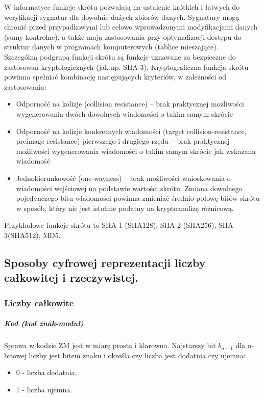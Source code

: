\documentclass[a4paper,12pt,oneside]{book}
\begin{document}
W informatyce funkcje skrótu pozwalają na ustalenie krótkich i łatwych do weryfikacji sygnatur dla dowolnie dużych zbiorów danych. Sygnatury mogą chronić przed przypadkowymi lub celowo wprowadzonymi modyfikacjami danych (sumy kontrolne), a także mają zastosowania przy optymalizacji dostępu do struktur danych w programach komputerowych (tablice mieszające).\\

Szczególną podgrupą funkcji skrótu są funkcje uznawane za bezpieczne do zastosowań kryptologicznych (jak np. SHA-3). Kryptograficzna funkcja skrótu powinna spełniać kombinację następujących kryteriów, w zależności od zastosowania:\\
\begin{itemize}
	\item Odporność na kolizje (collision resistance) – brak praktycznej możliwości wygenerowania dwóch dowolnych wiadomości o takim samym skrócie
	\item Odporność na kolizje konkretnych wiadomości (target collision-resistance, preimage resistance) pierwszego i drugiego rzędu – brak praktycznej możliwości wygenerowania wiadomości o takim samym skrócie jak wskazana wiadomość
	\item Jednokierunkowość (one-wayness) – brak możliwości wnioskowania o wiadomości wejściowej na podstawie wartości skrótu. Zmiana dowolnego pojedynczego bitu wiadomości powinna zmieniać średnio połowę bitów skrótu w sposób, który nie jest istotnie podatny na kryptoanalizę różnicową.
\end{itemize}

Przykładowe funkcje skrótu to SHA-1 (SHA128), SHA-2 (SHA256), SHA-3(SHA512), MD5.

\setcounter{subsection}{5}
\subsection{Sposoby cyfrowej reprezentacji liczby całkowitej i rzeczywistej.}

\subsubsection{Liczby całkowite}

\subparagraph{Kod  (kod znak-moduł)}

Sprawa w kodzie ZM jest w miarę prosta i klarowna. Najstarszy bit $b_{n-1}$ dla n-bitowej liczby jest bitem znaku i określa czy liczba jest dodatnia czy ujemna:
\begin{itemize}
	\item 0 - liczba dodatnia,
	\item 1 - liczba ujemna.
\end{itemize}
\end{document}
